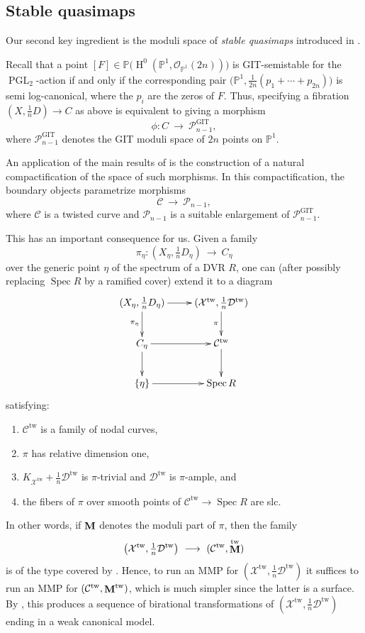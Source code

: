 \documentclass[a4paper,12pt]{amsart}
\DeclareMathOperator{\tw}{tw}
\DeclareMathOperator{\PGL}{PGL}
\DeclareMathOperator{\Spec}{Spec}
\DeclareMathOperator{\GIT}{GIT}
\newcommand{\bP}{{\mathbb P}}
\newcommand{\sP}{{\mathscr{P}}}
\newcommand{\cX}{{\mathcal{X}}}
\newcommand{\cO}{{\mathcal{O}}}
\newcommand{\oH}{{\operatorname{H}}}
\DeclareMathOperator{\bfM}{{\bf{M}}}
\newcommand\cD{{\mathcal{D}}}
\newcommand\cC{{\mathcal{C}}}
\theoremstyle{definition}
\theoremstyle{remark}
\begin{document}
\subsection*{Stable quasimaps}

Our second key ingredient is the moduli space of \emph{stable quasimaps} introduced in \cite{twisted_map_2}. 

Recall that a point 
\(
[F] \in \bP\bigl(\oH^0(\bP^1,\cO_{\bP^1}(2n))\bigr)
\)
is GIT-semistable for the $\PGL_2$-action if and only if the corresponding pair 
\(
\big(\bP^1,\tfrac{1}{2n}(p_1+\cdots+p_{2n})\big)
\)
is semi log-canonical, where the $p_i$ are the zeros of $F$. Thus, specifying a fibration 
\(
(X,\tfrac{1}{n}D)\to C
\)
as above is equivalent to giving a morphism 
\[
\phi\colon C \ \longrightarrow \ \sP^{\GIT}_{n-1},
\] 
where $\sP^{\GIT}_{n-1}$ denotes the GIT moduli space of $2n$ points on $\bP^1$. 

An application of the main results of \cite{twisted_map_2} is the construction of a natural compactification of the space of such morphisms. In this compactification, the boundary objects parametrize morphisms 
\[
\cC \ \longrightarrow\  \sP_{n-1},
\]
where $\cC$ is a twisted curve and $\sP_{n-1}$ is a suitable enlargement of $\sP^{\GIT}_{n-1}$. 

\medskip
This has an important consequence for us. Given a family 
\[
\pi_\eta\colon (X_{\eta},\tfrac{1}{n}D_{\eta}) \ \longrightarrow \  C_{\eta}
\]
over the generic point $\eta$ of the spectrum of a DVR $R$, one can (after possibly replacing $\Spec R$ by a ramified cover) extend it to a diagram
\[
\xymatrix{
(X_{\eta},\tfrac{1}{n}D_{\eta}) \ar[r] \ar[d]_{\pi_\eta} & (\cX^{\tw},\tfrac{1}{n}\cD^{\tw}) \ar[d]_\pi \\
C_{\eta} \ar[r] \ar[d] & \cC^{\tw} \ar[d] \\
\{\eta\} \ar[r] & \Spec R
}
\]
satisfying:
\begin{enumerate}
    \item $\cC^{\tw}$ is a family of nodal curves,
    \item $\pi$ has relative dimension one,
    \item $K_{\cX^{\tw}} + \tfrac{1}{n}\cD^{\tw}$ is $\pi$-trivial and $\cD^{\tw}$ is $\pi$-ample, and
    \item the fibers of $\pi$ over smooth points of $\cC^{\tw}\to \Spec R$ are slc.
\end{enumerate}

\noindent In other words, if $\bfM$ denotes the moduli part of $\pi$, then the family
\[
\big(\cX^{\tw},\tfrac{1}{n}\cD^{\tw}\big) \ \longrightarrow \ (\cC^{\tw},\bfM^{\tw})
\]
is of the type covered by . Hence, to run an MMP for $(\cX^{\tw},\tfrac{1}{n}\cD^{\tw})$ it suffices to run an MMP for $(\cC^{\tw},\bfM^{\tw})$, which is much simpler since the latter is a surface. By , this produces a sequence of birational transformations of $(\cX^{\tw},\tfrac{1}{n}\cD^{\tw})$ ending in a weak canonical model.
\end{document}
